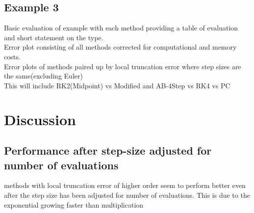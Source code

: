\documentclass[11pt]{article}	%
\begin{document}
\subsection{Example 3}
Basic evaluation of example with each method providing a table of evaluation and short statement on the type.\\
Error plot consisting of all methods corrected for computational and memory costs.\\
Error plots of methods paired up by local truncation error where step sizes are the same(excluding Euler)   \\
\hspace{2cm} This will include RK2(Midpoint) vs Modified and AB-4Step vs RK4 vs PC




\section{Discussion}

\subsection{Performance after step-size adjusted for number of evaluations}
methods with local truncation error of higher order seem to perform better even after the step size has been adjusted for number of evaluations. 
This is due to the exponential growing faster than multiplication
\end{document}

